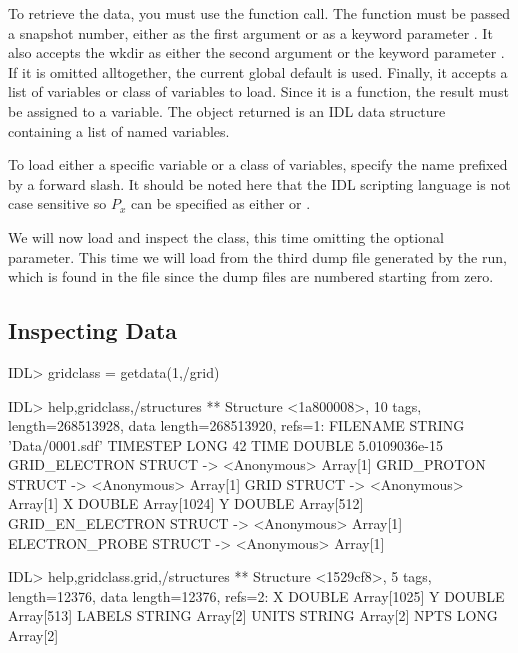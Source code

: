   To retrieve the data, you must use the  function call.
  The function must be passed a snapshot number, either as the first argument
  or as a keyword parameter . It also accepts the wkdir as
  either the second argument or the keyword parameter . If it is
  omitted alltogether, the current global default is used. Finally, it accepts
  a list of variables or class of variables to load.
  Since it is a function, the result must be assigned to a
  variable. The object returned is an IDL data structure containing a list
  of named variables.

  To load either a specific variable or a class of variables, specify the
  name prefixed by a forward slash. It should be noted here that the IDL
  scripting language is not case sensitive so $P_x$ can be specified as
  either  or .

  We will now load and inspect the  class, this time omitting
  the optional  parameter. This time we will load from the
  third dump file generated by the {\EPOCH} run, which is found in the
  file  since the dump files are numbered starting from zero.
%
\pagebreak
\subsection{Inspecting Data}

\begin{boxverbatim}
IDL> gridclass = getdata(1,/grid)

IDL> help,gridclass,/structures
** Structure <1a800008>, 10 tags, length=268513928, data length=268513920, refs=1:
   FILENAME        STRING    'Data/0001.sdf'
   TIMESTEP        LONG                42
   TIME            DOUBLE       5.0109036e-15
   GRID_ELECTRON   STRUCT    -> <Anonymous> Array[1]
   GRID_PROTON     STRUCT    -> <Anonymous> Array[1]
   GRID            STRUCT    -> <Anonymous> Array[1]
   X               DOUBLE    Array[1024]
   Y               DOUBLE    Array[512]
   GRID_EN_ELECTRON
                   STRUCT    -> <Anonymous> Array[1]
   ELECTRON_PROBE  STRUCT    -> <Anonymous> Array[1]

IDL> help,gridclass.grid,/structures
** Structure <1529cf8>, 5 tags, length=12376, data length=12376, refs=2:
   X               DOUBLE    Array[1025]
   Y               DOUBLE    Array[513]
   LABELS          STRING    Array[2]
   UNITS           STRING    Array[2]
   NPTS            LONG      Array[2]
\end{boxverbatim}

